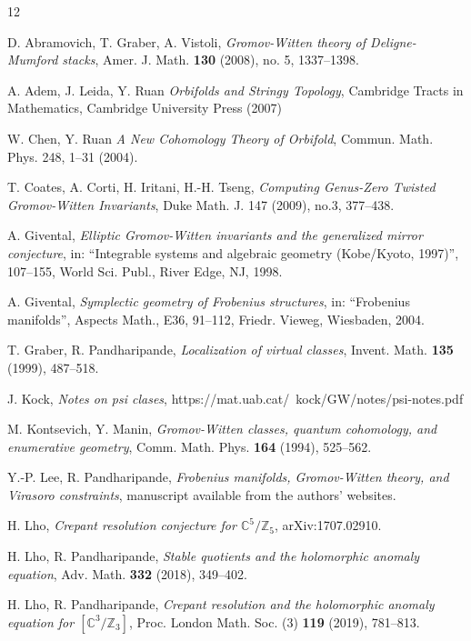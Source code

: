 \documentclass[12pt]{amsart}
\numberwithin{equation}{section}
\begin{document}
\begin{thebibliography}{12}

 D. Abramovich, T. Graber, A. Vistoli, {\em Gromov-Witten theory of Deligne-Mumford stacks}, Amer. J. Math. {\bf 130} (2008), no. 5, 1337--1398. 

 A. Adem, J. Leida, Y. Ruan {\em Orbifolds and Stringy Topology}, Cambridge Tracts in Mathematics, Cambridge University Press (2007)

 W. Chen, Y. Ruan {\em A New Cohomology Theory of Orbifold}, Commun. Math. Phys. 248, 1–31 (2004).

 T. Coates, A. Corti, H. Iritani, H.-H. Tseng, {\em  Computing Genus-Zero Twisted Gromov-Witten Invariants},  Duke Math. J. 147 (2009), no.3, 377--438.

 A. Givental, {\em Elliptic Gromov-Witten invariants and the generalized mirror conjecture}, in: ``Integrable systems and algebraic geometry (Kobe/Kyoto, 1997)'', 107--155, World Sci. Publ., River Edge, NJ, 1998.

 A. Givental, {\em Symplectic geometry of Frobenius structures}, in: ``Frobenius manifolds'', Aspects Math., E36, 91--112, Friedr. Vieweg, Wiesbaden, 2004.

 T. Graber, R. Pandharipande, {\em Localization of virtual classes}, Invent. Math. {\bf 135} (1999), 487--518.

 J. Kock, {\em Notes on psi clases}, https://mat.uab.cat/~kock/GW/notes/psi-notes.pdf

 M. Kontsevich, Y. Manin, {\em Gromov-Witten classes, quantum cohomology, and enumerative geometry}, Comm. Math. Phys. {\bf 164} (1994), 525--562.

 Y.-P. Lee, R. Pandharipande, {\em Frobenius manifolds, Gromov-Witten theory, and Virasoro constraints}, manuscript available from the authors' websites.

 H. Lho, {\em Crepant resolution conjecture for $\mathbb{C}^5/\mathbb{Z}_5$}, arXiv:1707.02910. 

 H. Lho, R. Pandharipande, {\em Stable quotients and the holomorphic anomaly equation}, Adv. Math. {\bf 332} (2018), 349--402. 

 H. Lho, R. Pandharipande, {\em Crepant resolution and the holomorphic anomaly equation for $[\mathbb{C}^3/\mathbb{Z}_3]$}, Proc. London Math. Soc. (3) {\bf 119} (2019), 781--813.


\end{thebibliography}
\end{document}
